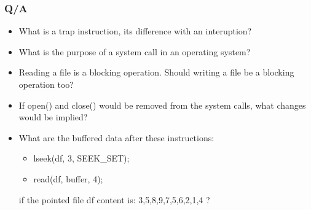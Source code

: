 \begin{frame}
  \frametitle{Q/A}
  \begin{itemize}
    \item What is a trap instruction, its difference with an interuption? %
    \item What is the purpose of a system call in an operating system? %
    \item Reading a file is a blocking operation. Should writing a file be a blocking operation too? %
    \item If {\scriptsize open()} and {\scriptsize close()} would be removed from the system calls, what changes would be implied?
    \item What are the buffered data after these instructions:
    \begin{itemize}
        \item lseek(df, 3, SEEK\_SET);
        \item read(df, buffer, 4);
   \end{itemize}
   if the pointed file df content is: 3,5,8,9,7,5,6,2,1,4 ?
  \end{itemize}
\end{frame}
